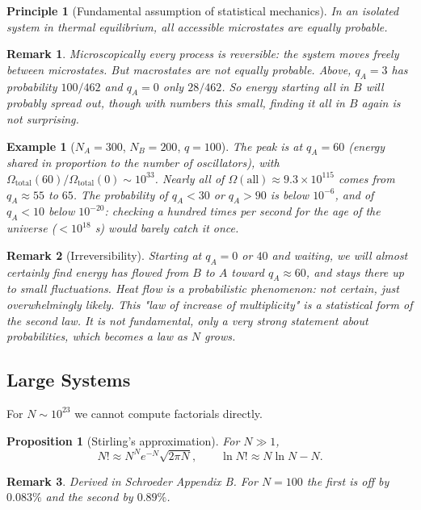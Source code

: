 \documentclass{article}
\newtheorem{principle}{Principle}
\newtheorem*{example}{Example}
\newtheorem{remark}{Remark}
\newtheorem{proposition}{Proposition}
\begin{document}
\begin{principle}[Fundamental assumption of statistical mechanics]
    In an isolated system in thermal equilibrium, all accessible microstates are equally probable.
\end{principle}
\begin{remark}
    Microscopically every process is reversible: the system moves freely between microstates. But macrostates are not equally probable. Above, $q_A = 3$ has probability $100/462$ and $q_A = 0$ only $28/462$. So energy starting all in $B$ will probably spread out, though with numbers this small, finding it all in $B$ again is not surprising.
\end{remark}

\begin{example}[$N_A = 300$, $N_B = 200$, $q = 100$]
    The peak is at $q_A = 60$ (energy shared in proportion to the number of oscillators), with $\Omega_{\text{total}}(60)/\Omega_{\text{total}}(0) \sim 10^{33}$. Nearly all of $\Omega(\text{all}) \approx 9.3 \times 10^{115}$ comes from $q_A \approx 55$ to $65$. The probability of $q_A < 30$ or $q_A > 90$ is below $10^{-6}$, and of $q_A < 10$ below $10^{-20}$: checking a hundred times per second for the age of the universe ($< 10^{18}$ s) would barely catch it once.
\end{example}

\begin{remark}[Irreversibility]
    Starting at $q_A = 0$ or $40$ and waiting, we will almost certainly find energy has flowed from $B$ to $A$ toward $q_A \approx 60$, and stays there up to small fluctuations. Heat flow is a probabilistic phenomenon: not certain, just overwhelmingly likely. This "law of increase of multiplicity" is a statistical form of the second law. It is not fundamental, only a very strong statement about probabilities, which becomes a law as $N$ grows.
\end{remark}

\subsection{Large Systems}
For $N \sim 10^{23}$ we cannot compute factorials directly.
\begin{proposition}[Stirling's approximation]
    For $N \gg 1$,
    \[N! \approx N^N e^{-N}\sqrt{2\pi N}, \qquad \ln N! \approx N \ln N - N.\]
\end{proposition}
\begin{remark}
    Derived in Schroeder Appendix B. For $N = 100$ the first is off by $0.083\%$ and the second by $0.89\%$.
\end{remark}
\end{document}
